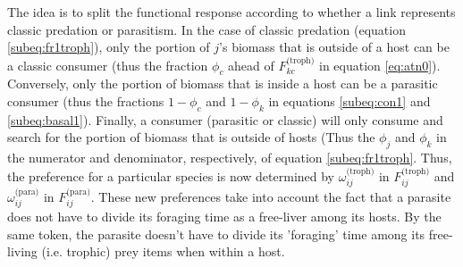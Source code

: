 \documentclass[11pt]{amsart}
\begin{document}
The idea is to split the functional response according to whether a link represents classic predation or parasitism.  In the case of classic predation (equation \eqref{subeq:fr1troph}), only the portion of $j$'s biomass that is outside of a host can be a classic consumer (thus the fraction $\phi_c$ ahead of $F_{kc}^\text{(troph)}$ in equation \eqref{eq:atn0}).  Conversely, only the portion of biomass that is inside a host can be a parasitic consumer (thus the fractions $1-\phi_c$ and $1-\phi_k$ in equations \eqref{subeq:con1} and \eqref{subeq:basal1}).  Finally, a consumer (parasitic or classic) will only consume and search for the portion of biomass that is outside of hosts (Thus the $\phi_j$ and $\phi_k$ in the numerator and denominator, respectively, of equation \eqref{subeq:fr1troph}.  Thus, the preference for a particular species is now determined by $\omega_{ij}^\text{(troph)}$ in $F_{ij}^\text{(troph)}$ and $\omega_{ij}^\text{(para)}$ in $F_{ij}^\text{(para)}$.  These new preferences take into account the fact that a parasite does not have to divide its foraging time as a free-liver among its hosts.  By the same token, the parasite doesn't have to divide its 'foraging' time among its free-living (i.e. trophic) prey items when within a host.
\end{document}
